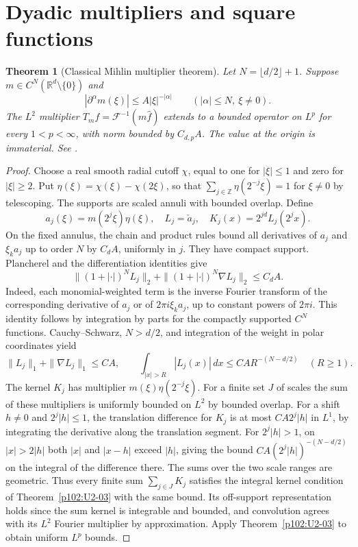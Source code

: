 \documentclass[11pt,oneside,openany]{book}
\newtheorem{theorem}{Theorem}[chapter]
\theoremstyle{definition}
\theoremstyle{remark}
\begin{document}
\section{Dyadic multipliers and square functions}

\begin{theorem}[Classical Mihlin multiplier theorem]
\label{p102:U3-05}
Let \(N=\lfloor d/2\rfloor+1\). Suppose \(m\in C^N(\mathbb R^d\setminus\{0\})\) and
\[
 |\partial^\alpha m(\xi)|\le A|\xi|^{-|\alpha|}
 \qquad (|\alpha|\le N,\ \xi\ne0).
\]
The \(L^2\) multiplier \(T_m f=\mathcal F^{-1}(m\widehat f)\) extends to a bounded operator on \(L^p\) for every \(1<p<\infty\), with norm bounded by \(C_{d,p}A\). The value at the origin is immaterial. See \cite[\S6.2.3]{grafakos}.
\end{theorem}
\begin{proof}
Choose a real smooth radial cutoff \(\chi\), equal to one for \(|\xi|\le1\) and zero for \(|\xi|\ge2\). Put \(\eta(\xi)=\chi(\xi)-\chi(2\xi)\), so that \(\sum_{j\in\mathbb Z}\eta(2^{-j}\xi)=1\) for \(\xi\ne0\) by telescoping. The supports are scaled annuli with bounded overlap. Define
\[
 a_j(\xi)=m(2^j\xi)\eta(\xi),\quad L_j=\check a_j,\quad K_j(x)=2^{jd}L_j(2^j x).
\]
On the fixed annulus, the chain and product rules bound all derivatives of \(a_j\) and \(\xi_k a_j\) up to order \(N\) by \(C_dA\), uniformly in \(j\). They have compact support. Plancherel and the differentiation identities give
\[
 \|(1+|\cdot|)^N L_j\|_2+
 \|(1+|\cdot|)^N\nabla L_j\|_2\le C_d A .
\]
Indeed, each monomial-weighted term is the inverse Fourier transform of the corresponding derivative of \(a_j\) or of \(2\pi i\xi_k a_j\), up to constant powers of \(2\pi i\). This identity follows by integration by parts for the compactly supported \(C^N\) functions. Cauchy--Schwarz, \(N>d/2\), and integration of the weight in polar coordinates yield
\[
 \|L_j\|_1+\|\nabla L_j\|_1\le C A,\qquad
 \int_{|x|>R}|L_j(x)|\,dx\le C A R^{-(N-d/2)}
 \quad(R\ge1).
\]
The kernel \(K_j\) has multiplier \(m(\xi)\eta(2^{-j}\xi)\). For a finite set \(J\) of scales the sum of these multipliers is uniformly bounded on \(L^2\) by bounded overlap. For a shift \(h\ne0\) and \(2^j|h|\le1\), the translation difference for \(K_j\) is at most \(C A 2^j|h|\) in \(L^1\), by integrating the derivative along the translation segment. For \(2^j|h|>1\), on \(|x|>2|h|\) both \(|x|\) and \(|x-h|\) exceed \(|h|\), giving the bound \(C A(2^j|h|)^{-(N-d/2)}\) on the integral of the difference there. The sums over the two scale ranges are geometric. Thus every finite sum \(\sum_{j\in J}K_j\) satisfies the integral kernel condition of Theorem~\ref{p102:U2-03} with the same bound. Its off-support representation holds since the sum kernel is integrable and bounded, and convolution agrees with its \(L^2\) Fourier multiplier by approximation. Apply Theorem~\ref{p102:U2-03} to obtain uniform \(L^p\) bounds.


\end{proof}
\end{document}
